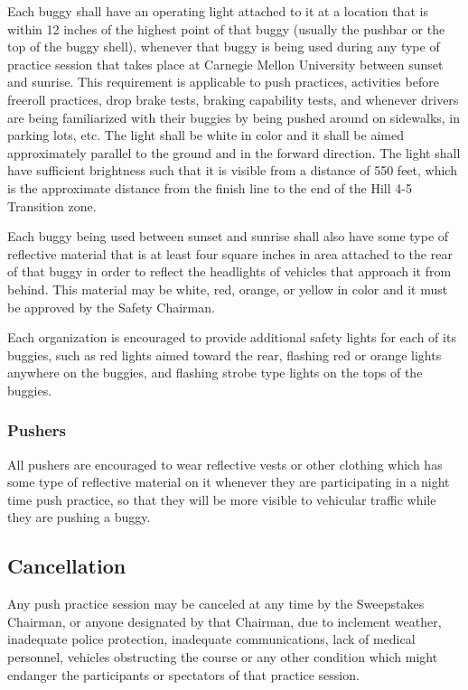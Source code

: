 	Each buggy shall have an operating light attached to it at a location that is within 12 inches of the highest point of that buggy (usually the pushbar or the top of the buggy shell), whenever that buggy is being used during any type of practice session that takes place at Carnegie Mellon University between sunset and sunrise. This requirement is applicable to push practices, activities before freeroll practices, drop brake tests, braking capability tests, and whenever drivers are being familiarized with their buggies by being pushed around on sidewalks, in parking lots, etc. The light shall be white in color and it shall be aimed approximately parallel to the ground and in the forward direction. The light shall have sufficient brightness such that it is visible from a distance of 550 feet, which is the approximate distance from the finish line to the end of the Hill 4-5 Transition zone.

	Each buggy being used between sunset and sunrise shall also have some type of reflective material that is at least four square inches in area attached to the rear of that buggy in order to reflect the headlights of vehicles that approach it from behind. This material may be white, red, orange, or yellow in color and it must be approved by the Safety Chairman.

	Each organization is encouraged to provide additional safety lights for each of its buggies, such as red lights aimed toward the rear, flashing red or orange lights anywhere on the buggies, and flashing strobe type lights on the tops of the buggies.

\subsubsection{Pushers}

	All pushers are encouraged to wear reflective vests or other clothing which has some type of reflective material on it whenever they are participating in a night time push practice, so that they will be more visible to vehicular traffic while they are pushing a buggy.

\subsection{Cancellation}

	Any push practice session may be canceled at any time by the Sweepstakes Chairman, or anyone designated by that Chairman, due to inclement weather, inadequate police protection, inadequate communications, lack of medical personnel, vehicles obstructing the course or any other condition which might endanger the participants or spectators of that practice session.

